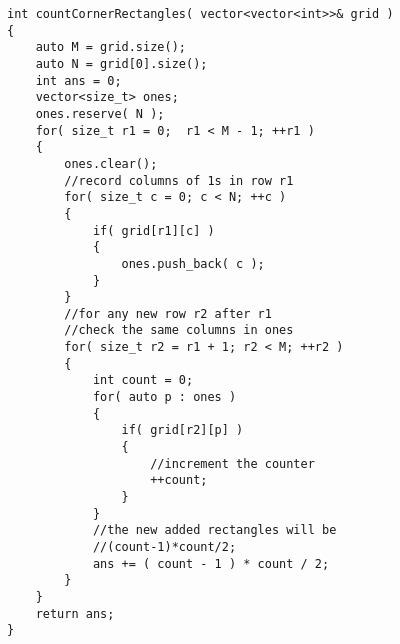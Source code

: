 \begin{lstlisting}[style=customc, caption={Optimized}]
int countCornerRectangles( vector<vector<int>>& grid )
{
    auto M = grid.size();
    auto N = grid[0].size();
    int ans = 0;
    vector<size_t> ones;
    ones.reserve( N );
    for( size_t r1 = 0;  r1 < M - 1; ++r1 )
    {
        ones.clear();
        //record columns of 1s in row r1
        for( size_t c = 0; c < N; ++c )
        {
            if( grid[r1][c] )
            {
                ones.push_back( c );
            }
        }
        //for any new row r2 after r1
        //check the same columns in ones
        for( size_t r2 = r1 + 1; r2 < M; ++r2 )
        {
            int count = 0;
            for( auto p : ones )
            {
                if( grid[r2][p] )
                {
                    //increment the counter
                    ++count;
                }
            }
            //the new added rectangles will be
            //(count-1)*count/2;
            ans += ( count - 1 ) * count / 2;
        }
    }
    return ans;
}
\end{lstlisting}